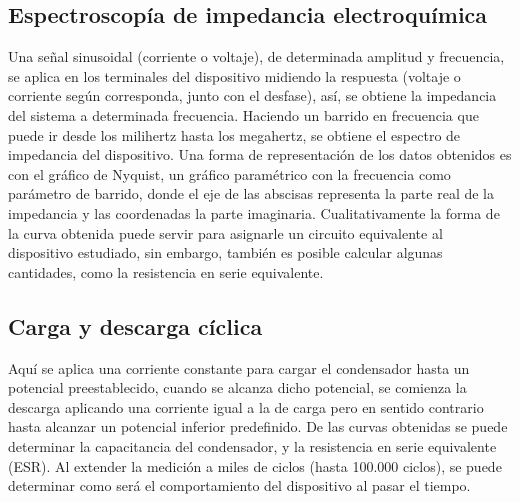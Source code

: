 \subsection{Espectroscopía de impedancia electroquímica}
Una señal sinusoidal (corriente o voltaje), de determinada amplitud y frecuencia, se aplica en los terminales del dispositivo midiendo la respuesta (voltaje o corriente según corresponda, junto con el desfase), así, se obtiene la impedancia del sistema a determinada frecuencia. Haciendo un barrido en frecuencia que puede ir desde los milihertz hasta los megahertz, se obtiene el espectro de impedancia del dispositivo. Una forma de representación de los datos obtenidos es con el gráfico de Nyquist, un gráfico paramétrico con la frecuencia como parámetro de barrido, donde el eje de las abscisas representa la parte real de la impedancia y las coordenadas la parte imaginaria. Cualitativamente la forma de la curva obtenida puede servir para asignarle un circuito equivalente al dispositivo estudiado, sin embargo, también es posible calcular algunas cantidades, como la resistencia en serie equivalente.

\subsection{Carga y descarga cíclica}
Aquí se aplica una corriente constante para cargar el condensador hasta un potencial preestablecido, cuando se alcanza dicho potencial, se comienza la descarga aplicando una corriente igual a la de carga pero en sentido contrario hasta alcanzar un potencial inferior predefinido. De las curvas obtenidas se puede determinar la capacitancia del condensador, y la resistencia en serie equivalente (ESR). Al extender la medición a miles de ciclos (hasta 100.000 ciclos), se puede determinar como será el comportamiento del dispositivo al pasar el tiempo.